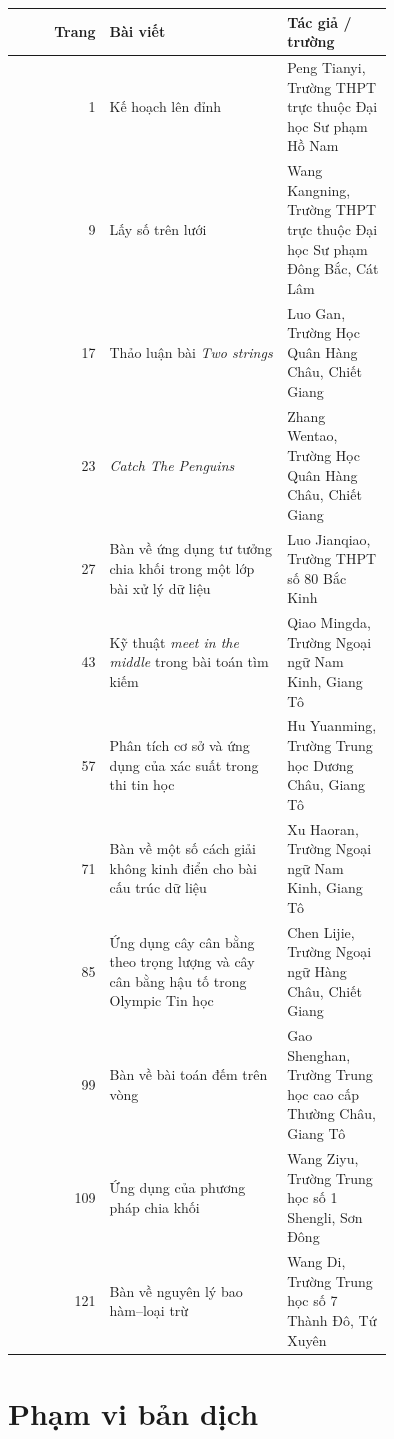 \documentclass[11pt]{article}
\begin{document}
\begin{center}
\begin{tabular}{r >{\raggedright\arraybackslash}p{0.47\linewidth} >{\raggedright\arraybackslash}p{0.28\linewidth}}
\textbf{Trang} & \textbf{Bài viết} & \textbf{Tác giả / trường} \\
\hline
1 & Kế hoạch lên đỉnh & Peng Tianyi, Trường THPT trực thuộc Đại học Sư phạm Hồ Nam \\
9 & Lấy số trên lưới & Wang Kangning, Trường THPT trực thuộc Đại học Sư phạm Đông Bắc, Cát Lâm \\
17 & Thảo luận bài \emph{Two strings} & Luo Gan, Trường Học Quân Hàng Châu, Chiết Giang \\
23 & \emph{Catch The Penguins} & Zhang Wentao, Trường Học Quân Hàng Châu, Chiết Giang \\
27 & Bàn về ứng dụng tư tưởng chia khối trong một lớp bài xử lý dữ liệu & Luo Jianqiao, Trường THPT số 80 Bắc Kinh \\
43 & Kỹ thuật \emph{meet in the middle} trong bài toán tìm kiếm & Qiao Mingda, Trường Ngoại ngữ Nam Kinh, Giang Tô \\
57 & Phân tích cơ sở và ứng dụng của xác suất trong thi tin học & Hu Yuanming, Trường Trung học Dương Châu, Giang Tô \\
71 & Bàn về một số cách giải không kinh điển cho bài cấu trúc dữ liệu & Xu Haoran, Trường Ngoại ngữ Nam Kinh, Giang Tô \\
85 & Ứng dụng cây cân bằng theo trọng lượng và cây cân bằng hậu tố trong Olympic Tin học & Chen Lijie, Trường Ngoại ngữ Hàng Châu, Chiết Giang \\
99 & Bàn về bài toán đếm trên vòng & Gao Shenghan, Trường Trung học cao cấp Thường Châu, Giang Tô \\
109 & Ứng dụng của phương pháp chia khối & Wang Ziyu, Trường Trung học số 1 Shengli, Sơn Đông \\
121 & Bàn về nguyên lý bao hàm--loại trừ & Wang Di, Trường Trung học số 7 Thành Đô, Tứ Xuyên
\end{tabular}
\end{center}

\section{Phạm vi bản dịch}
\end{document}
